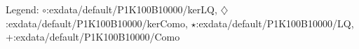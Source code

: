 Legend: {\color{CornflowerBlue}$\circ$}:exdata/default/P1K100B10000/kerLQ, {\color{Orange}$\diamondsuit$}:exdata/default/P1K100B10000/kerComo, {\color{Green}$\star$}:exdata/default/P1K100B10000/LQ, {\color{red}+}:exdata/default/P1K100B10000/Como